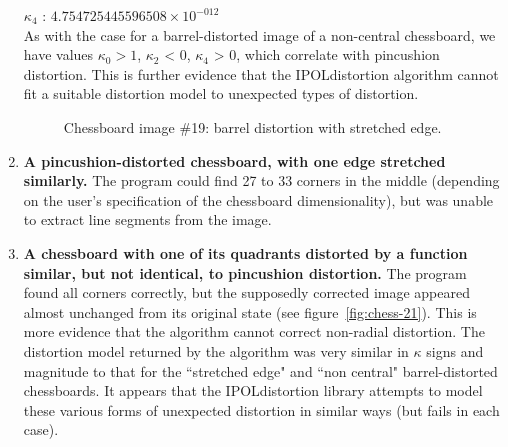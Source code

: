 \begin{enumerate}
   $ \kappa_{4}$ : $4.754725445596508 \times 10^{-012}$\\
  As with the case for a barrel-distorted image of a non-central chessboard, we have values $\kappa_{0} > 1$, $\kappa_{2}$ < 0, $\kappa_{4}$ > 0, which correlate with pincushion distortion. This is further evidence that the IPOLdistortion algorithm cannot fit a suitable distortion model to unexpected types of distortion.
\begin{figure}[H]
  \centering
  \caption{Chessboard image \#19: barrel distortion with stretched edge.}
  \label{fig:chess-19}
\end{figure}
  \item \textbf{A pincushion-distorted chessboard, with one edge stretched similarly.} The program could find 27 to 33 corners in the middle (depending on the user's specification of the chessboard dimensionality), but was unable to extract line segments from the image.
  \item \textbf{A chessboard with one of its quadrants distorted by a function similar, but not identical, to pincushion distortion.} The program found all corners correctly, but the supposedly corrected image appeared almost unchanged from its original state (see figure~\ref{fig:chess-21}). This is more evidence that the algorithm cannot correct non-radial distortion. The distortion model returned by the algorithm was very similar in $\kappa$ signs and magnitude to that for the ``stretched edge" and ``non central" barrel-distorted chessboards. It appears that the IPOLdistortion library attempts to model these various forms of unexpected distortion in similar ways (but fails in each case).

\end{enumerate}
